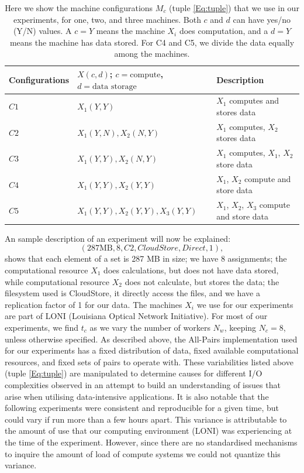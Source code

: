 \documentclass{rspublic}
\begin{document}
\begin{table}
\begin{center}
    \begin{tabular}{ | l | l | l |}
    \hline
    Configurations & $X(c,d)$; $c= \mbox{compute}$, $d=\mbox{data storage}$ & Description  \\ \hline
    $C1$ & $X_1(Y,Y)$  & $X_1$ computes and stores data\\ \hline    
    $C2$ & $X_1(Y,N), X_2(N,Y)$  & $X_1$ computes, $X_2$ stores data \\ \hline
    $C3$ & $X_1(Y,Y), X_2(N,Y)$  & $X_1$ computes, $X_1$, $X_2$ store data \\ \hline
    $C4$ & $X_1(Y,Y), X_2(Y,Y)$  & $X_1$, $X_2$ compute and store data \\ \hline
    $C5$ & $X_1(Y,Y), X_2(Y,Y), X_3(Y,Y)$  & $X_1$, $X_2$, $X_3$ compute and store data \\ 
    \hline
    \end{tabular}
\end{center}
    \caption{Here we show the machine configurations $M_c$ (tuple
\ref{Eq:tuple}) that we use in our experiments, for one, two, and three
machines. Both $c$ and $d$ can have yes/no (Y/N) values. A $c = Y$ means
the machine $X_i$ does computation, and a $d = Y$ means the machine has
data stored. For C4 and C5, we divide the data equally among the
machines.}
    \label{Tab:Configs}
\end{table}

An sample description of an experiment will now be explained:
 \begin{equation}
(287 \mbox{MB}, 8, C2, CloudStore, Direct, 1),
\end{equation}
shows that each element of a set is 287 MB in size; we have 8
assignments; the computational resource $X_1$ does calculations, but
does not have data stored, while computational resource $X_2$ does not
calculate, but stores the data; the filesystem used is CloudStore, it
directly access the files, and we have a replication factor of 1 for our
data. The machines $X_i$ we use for our experiments are part of LONI
(Louisiana Optical Network Initiative). For most of our experiments, we
find $t_c$ as we vary the number of workers $N_w$, keeping $N_c=8$,
 unless otherwise specified. As described
above, the All-Pairs implementation used for our experiments has a fixed
distribution of data, fixed available computational resources, and fixed
sets of pairs to operate with. These variabilities listed above (tuple
\ref{Eq:tuple}) are manipulated to determine causes for different I/O
complexities observed in an attempt to build an understanding of issues
that arise when utilising data-intensive applications. It is also
notable that the following experiments were consistent and reproducible
for a given time, but could vary if run more than a few hours apart.
This variance is attributable to the amount of use that our computing
environment (LONI) was experiencing at the time of the experiment. However, since 
there are no standardised mechanisms to inquire the amount of load of compute systems we could not quantize this variance.
\end{document}
